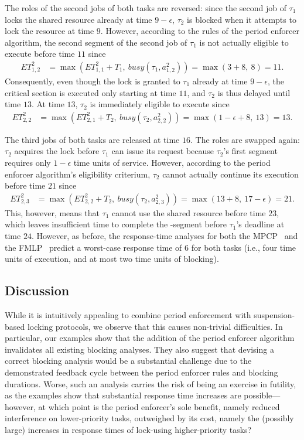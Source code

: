 The roles of the second jobs of both tasks are reversed: since the second job of $\tau_1$ locks the shared resource already at time $9-\epsilon$, $\tau_2$ is blocked when it attempts to lock the resource at time $9$. However, according to the rules of the period enforcer algorithm, the second segment of the second job of $\tau_1$ is not actually eligible to execute before time $11$ since
\begin{align*}
	ET_{1,2}^2 & = \max\left(ET_{1,1}^2 + T_1,\ \mathit{busy}(\tau_1, a^2_{1,2})\right) =\max(3 + 8,\ 8) = 11.
\end{align*}
Consequently, even though the lock is granted to $\tau_1$ already  at time $9-\epsilon$, the critical section is executed only starting at time $11$, and $\tau_2$ is thus delayed until time $13$. At time $13$, $\tau_2$ is immediately eligible to execute since
\begin{align*}
	ET_{2,2}^2 & = \max\left(ET_{2,1}^2 + T_2,\ \mathit{busy}(\tau_2, a^2_{2,2})\right) =\max(1-\epsilon + 8,\ 13) = 13.
\end{align*}

The third jobs of both tasks are released at time $16$. The roles are swapped again: $\tau_2$ acquires the lock before $\tau_1$ can issue its request because $\tau_2$'s first segment requires only $1-\epsilon$ time units of service. However, according to the period enforcer algorithm's eligibility criterium, $\tau_2$ cannot actually continue its execution before time $21$ since
\begin{align*}
	ET_{2,3}^2 & = \max\left(ET_{2,2}^2 + T_2,\ \mathit{busy}(\tau_2, a^2_{2,3})\right) =\max(13 + 8,\ 17-\epsilon) = 21.
\end{align*}
This, however, means that $\tau_1$ cannot use the shared resource before time $23$, which leaves insufficient time to complete the -segment before $\tau_1$'s deadline at time $24$. However, as before,  the response-time analyses for both the MPCP~\cite{Br:13,LNR:09} and the   FMLP~\cite{Br:13} predict a worst-case response time of $6$ for both tasks (i.e., four time units of execution, and at most two time units of blocking).

\subsection{Discussion}

While it is intuitively appealing to combine period enforcement with suspension-based locking protocols, we observe that this causes non-trivial difficulties. In particular, our examples show that the addition of the period enforcer algorithm invalidates all existing blocking analyses. They also suggest that devising a correct blocking analysis would be a substantial challenge due to the demonstrated feedback cycle between the period enforcer rules and blocking durations. Worse, such an analysis carries the risk of being an exercise in futility, as the examples show that substantial response time increases are possible---however, at which point is the period enforcer's sole benefit, namely reduced interference on lower-priority tasks, outweighed by its cost, namely the (possibly large) increases in response times of lock-using higher-priority tasks?

